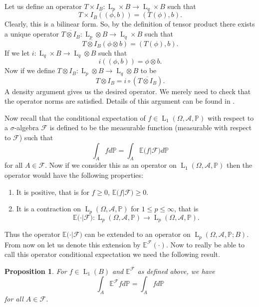 \documentclass[]{report}
\newcommand{\lp}[2]{\operatorname{L}_{#1}({#2})}
\newcommand*{\ext}[1]{\mathbb{E}\big({#1}\big)}
\newcommand{\pspc}{\Omega,\mathcal{A},\mathbb{P}}
\newcommand*{\extop}[1]{\mathbb{E}^{{#1}}}
\newtheorem{prop}[theorem]{Proposition}
\begin{document}
Let us define an operator $T\times I_B: \operatorname{L}_p \times B \rightarrow \operatorname{L}_q \times B$ such that \[ T\times I_B\left((\phi,b)\right)=(T(\phi),b). \] Clearly, this is a bilinear form. So, by the definition of tensor product there exists a unique operator $\overline{T\otimes I_B}: \operatorname{L}_p \otimes B \rightarrow \operatorname{L}_q \times B$ such that \[ \overline{T\otimes I_B}\left(\phi\otimes b\right)=(T(\phi),b). \]If we let $i: \operatorname{L}_q \times B \rightarrow \operatorname{L}_q \otimes B$ such that \[ i\left((\phi,b)\right)=\phi\otimes b. \] Now if we define ${T\otimes I_B}: \operatorname{L}_p \otimes B \rightarrow \operatorname{L}_q \otimes B$ to be \[ T\otimes I_B= i \circ (\overline{T\otimes I_B}). \] A density argument gives us the desired operator. We merely need to check that the operator norms are satisfied. Details of this argument can be found in \cite{pis}.

Now recall that the conditional expectation of $f\in\operatorname{L}_1(\pspc)$ with respect to a $\sigma$-algebra $\mathcal{F}$ is defined to be the measurable function (measurable with respect to $\mathcal{F}$) such that
\[ \int_A f d\mathbb{P}= \int_A\ext{f|\mathcal{F}}d\mathbb{P} \] for all $A\in\mathcal{F}$. Now if we consider this as an operator on $\lp{1}{\pspc}$ then the operator would have the following properties:
\begin{enumerate}
	\item It is positive, that is for $f\geq 0$, $\ext{f|\mathcal{F}}\geq0$.
	\item It is a contraction on $\lp{p}{\pspc}$ for $1\leq p \leq \infty$, that is \[\ext{\cdot|\mathcal{F}}: \lp{p}{\pspc} \rightarrow \lp{p}{\pspc}.\]
\end{enumerate}
Thus the operator $\ext{\cdot|\mathcal{F}}$ can be extended to an operator on $\lp{p}{\pspc;B}$. From now on let us denote this extension by $\extop{\mathcal F}(\cdot)$. Now to really be able to call this operator conditional expectation we need the following result.

\begin{prop}\label{cexp}
	For $f \in \lp{1}{B}$ and $\extop{\mathcal F}$ as defined above, we have \[ \int_A \extop{\mathcal F}fd\mathbb{P}= \int_A f d\mathbb{P} \] for all $A \in \mathcal{F}$.
\end{prop}
\end{document}
